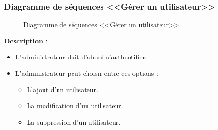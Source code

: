 \documentclass[12pt]{report}
\begin{document}
\newpage

\subsubsection{Diagramme de séquences <<G\'erer un utilisateur>>}

\begin{figure}[h]
\centering
    \centerline{}
    \caption{Diagramme de séquences <<G\'erer un utilisateur>>}
\end{figure}

\vspace{0.3in}

\textbf{Description :}

\begin{itemize}
    \item L'administrateur doit d'abord s'authentifier.
    \item L'administrateur peut choisir entre ces options :
    \begin{itemize}
        \item L'ajout d'un utilisateur.
        \item La modification d'un utilisateur.
        \item La suppression d'un utilisateur.
    \end{itemize}
\end{itemize}
\end{document}
